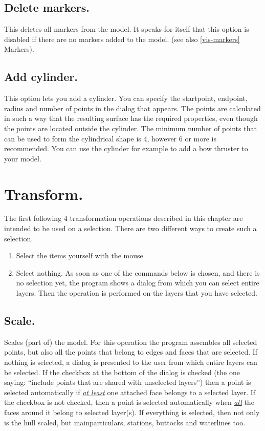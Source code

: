 \documentclass[12pt]{article}
\begin{document}
\subsection{Delete markers.}
This deletes all markers from the model. It speaks for itself that
this option is disabled if there are no markers added to the
model. (see also \ref{vis-markers} Markers).

\subsection{Add cylinder.}
This option lets you add a cylinder. You can specify the startpoint,
endpoint, radius and number of points in the dialog that appears. The
points are calculated in such a way that the resulting surface has the
required properties, even though the points are located outside the
cylinder. The minimum number of points that can be used to form the
cylindrical shape is 4, however 6 or more is recommended. You can use
the cylinder for example to add a bow thruster to your model.

\pagebreak

\section{Transform.}
The first following 4 transformation operations described in this chapter are intended to be used on
a selection. There are two different ways to create such a selection.

\begin{enumerate}

\item Select the items yourself with the mouse

\item Select nothing. As soon as one of the commands below is chosen, and there is no
selection yet, the program shows a dialog from which you can select entire layers. Then the
operation is performed on the layers that you have selected.

\end{enumerate}

\subsection{Scale.} \label{scale}
Scales (part of) the model. For this operation the program assembles
all selected points, but also all the points that belong to edges and
faces that are selected. If nothing is selected, a dialog is presented
to the user from which entire layers can be selected. If the checkbox
at the bottom of the dialog is checked (the one saying: “include
points that are shared with unselected layers”) then a point is
selected automatically if \underline{\textit{at least}} one attached face belongs to a
selected layer. If the checkbox is not checked, then a point is
selected automatically when \underline{\textit{all}} the faces around it belong to selected
layer(s). If everything is selected, then not only is the hull scaled,
but mainparticulars, stations, buttocks and waterlines too.
\end{document}
